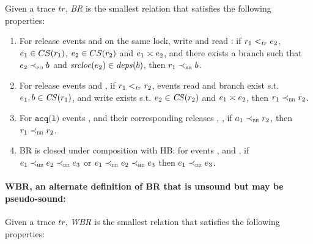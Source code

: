 \documentclass[letter,10pt]{article}
\newcommand{\CS}[1]{\ensuremath{\mathit{CS(}#1)}\xspace}
\newcommand{\conflicts}[2]{\ensuremath{#1 \asymp #2}} %
\newcommand{\getStatic}[1]{\ensuremath{\mathit{srcloc}(#1)}\xspace}
\newcommand{\getDeps}[1]{\ensuremath{\mathit{deps}(#1)}\xspace}
\newcommand{\tr}{\ensuremath{\mathit{tr}}\xspace}
\newcommand{\PO}{PO\xspace}
\newcommand{\HB}{HB\xspace}
\newcommand{\BR}{BR\xspace}
\newcommand{\WBR}{W\BR}
\newcommand{\ltTR}{\ensuremath{<_\textsc{\tr}}\xspace}
\newcommand{\ltPO}{\ensuremath{\prec_\textsc{\tiny{\PO}}}\xspace}
\newcommand{\ltHB}{\ensuremath{\prec_\textsc{\tiny{\HB}}}\xspace}
\newcommand{\ltBR}{\ensuremath{\prec_\textsc{\tiny{\BR}}}\xspace}
\newcommand{\Ordered}[3]{\ensuremath{#1 #2 #3}}
\newcommand{\TROrdered}[2]{\Ordered{#1}{\ltTR}{#2}}
\newcommand{\POOrdered}[2]{\Ordered{#1}{\ltPO}{#2}}
\newcommand{\HBOrdered}[2]{\Ordered{#1}{\ltHB}{#2}}
\newcommand{\BROrdered}[2]{\Ordered{#1}{\ltBR}{#2}}
\newcommand{\code}[1]{\texttt{#1}}
\newcommand{\Acquire}[1]{\ensuremath{\code{acq(#1)}}}
\newcommand\BrDepsOn[2]{\ensuremath{\getStatic{#2} \in \getDeps{#1}}}
\begin{document}
Given a trace \tr, \textit{\BR} is the smallest relation that satisfies
the following properties:

\begin{enumerate}[label=(\alph*)]
\item For release events  and  on the same lock, write  and read : if
  \TROrdered{\event{r}{_1}}{\event{e}{_2}}, $\event{e}{_1} \in CS(\event{r}{_1})$, $\event{e}{_2} \in CS(\event{r}{_2})$
  and \conflicts{\event{e}{_1}}{\event{e}{_2}}, and there exists a
  branch  such that \POOrdered{\event{e}{_2}}{\event{b}{}} and
  \BrDepsOn{\event{b}{}}{\event{e}{_2}}, then \BROrdered{\event{r}{_1}}{\event{b}{}}.
\item For release events  and , if
  \TROrdered{\event{r}{_1}}{\event{r}{_2}}, events read  and branch
   exist s.t. $\event{e}{_1},\event{b}{}\in\CS{\event{r}{_1}}$, and
  write  exists s.t. $\event{e}{_2} \in \CS{\event{r}{_2}}$ and
  \conflicts{\event{e}{_1}}{\event{e}{_2}}, then \BROrdered{\event{r}{_1}}{\event{r}{_2}}.
\item For \Acquire{l} events ,  and their corresponding
  releases , , if \BROrdered{\event{a}{_1}}{\event{r}{_2}},
  then \BROrdered{\event{r}{_1}}{\event{r}{_2}}. \label{rel-rule-b}
\item \BR is closed under composition with \HB: for
  events ,  and , if
  \HBOrdered{\event{e}{_1}}{\BROrdered{\event{e}{_2}}{\event{e}{_3}}} or
  \BROrdered{\event{e}{_1}}{\HBOrdered{\event{e}{_2}}{\event{e}{_3}}}
  then \BROrdered{\event{e}{_1}}{\event{e}{_3}}. \label{rel-hb-comp}
\end{enumerate}

\paragraph{\WBR, an alternate definition of \BR that is unsound but may be pseudo-sound:}

Given a trace \tr, \textit{\WBR} is the smallest relation that satisfies
the following properties:
\end{document}
